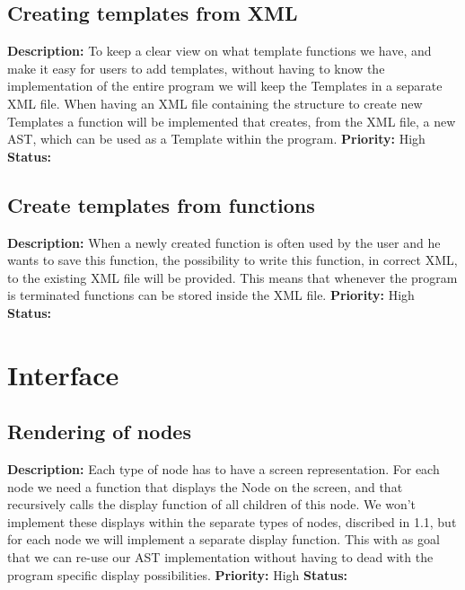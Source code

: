 \documentclass[a4paper,12pt]{report}
\begin{document}
\subsection{Creating templates from XML}
\textbf{Description: } To keep a clear view on what template functions we have, and make it easy for users to add templates, without having to know the implementation
of the entire program we will keep the Templates in a separate XML file. When having an XML file containing the structure to create new Templates a function will be implemented that creates, from the XML file, a new AST, which 
can be used as a Template within the program.\newline
\textbf{Priority:} High \newline
\textbf{Status: } \newline
\subsection{Create templates from functions}
\textbf{Description: } When a newly created function is often used by the user and he wants to save this function, the possibility to write this function, in correct XML, to
the existing XML file will be provided. This means that whenever the program is terminated functions can be stored inside the XML file.\newline
\textbf{Priority:} High \newline
\textbf{Status: } \newline
\section{Interface}
\subsection{Rendering of nodes}
\textbf{Description: }Each type of node has to have a screen representation. For each node we need a function that displays the Node on the screen, and 
that recursively calls the display function of all children of this node. We won't implement these displays within the separate types of nodes, discribed in 1.1, but 
for each node we will implement a separate display function. This with as goal that we can re-use our AST implementation without having to dead
with the program specific display possibilities.  \newline
\textbf{Priority:} High \newline
\textbf{Status: } \newline
\end{document}

